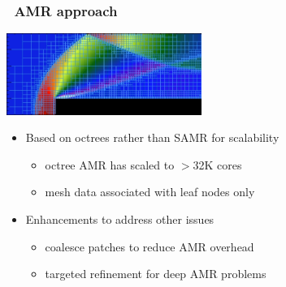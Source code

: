 \begin{frame}[fragile] 
\frametitle{\cello\ AMR approach}
\centerline{\includegraphics[width=2.5in]{paramesh2.png}}
\begin{itemize}
 \item  Based on octrees rather than SAMR for scalability
\begin{itemize}
 \item    octree AMR has scaled to $>$32K cores
 \item    mesh data associated with leaf nodes only
\end{itemize}
 \item Enhancements to address other issues
\begin{itemize}
 \item   coalesce patches to reduce AMR overhead
 \item   targeted refinement for deep AMR problems
\end{itemize}
\end{itemize}
\end{frame}

